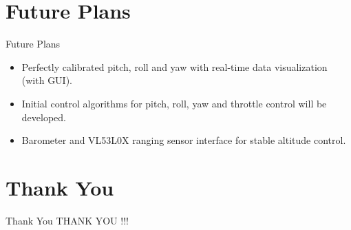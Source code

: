 \documentclass[10pt, a4paper]{beamer}
\begin{document}
\section{Future Plans}
\begin{frame}{Future Plans}
\begin{itemize}
\item Perfectly calibrated pitch, roll and yaw with real-time data visualization (with GUI).\\
\item Initial control algorithms for pitch, roll, yaw and throttle control will be developed.\\
\item Barometer and VL53L0X ranging sensor interface for stable altitude control.
\end{itemize}
\end{frame}


\section{Thank You}
\begin{frame}{Thank You}
	\centering THANK YOU !!!
\end{frame}
\end{document}
